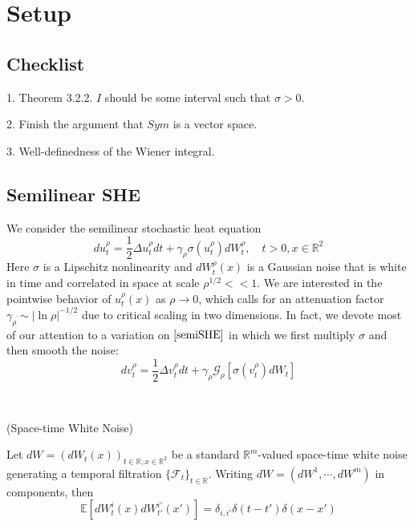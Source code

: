 \newcommand{\htk}{\mathcal{G}}
\newcommand{\tr}{\text{tr}}
\newcommand{\Lip}{\text{Lip}}
\newcommand{\ropV}{\mathcal{V}^{\sigma,\rho}}
\newcommand{\Qbar}{\overline{Q}_{\text{FBSDE}}}
\newcommand{\waser}{\mathcal{W}}
\newcommand{\R}{\mathbb{R}}

\section{Setup}

\subsection{Checklist}

1. Theorem 3.2.2. $I$ should be some interval such that $\sigma > 0$.\par
2. Finish the argument that $Sym$ is a vector space.\par
3. Well-definedness of the Wiener integral.\par

\subsection{Semilinear SHE}

We consider the semilinear stochastic heat equation
\[du^{\rho}_t = \dfrac{1}{2}\Delta u_t^{\rho}dt + \gamma_{\rho}\sigma(u_t^{\rho})dW_t^{\rho},\quad t>0, x\in\mathbb{R}^2\label{semiSHE}\]
Here $\sigma$ is a Lipschitz nonlinearity and $dW_t^{\rho}(x)$ is a Gaussian noise that is white in time and correlated in space at scale $\rho^{1/2} << 1$. We are interested in the pointwise behavior of $u_t^{\rho}(x)$ as $\rho \to 0$, which calls for an attenuation factor $\gamma_{\rho}\sim |\ln \rho|^{-1/2}$ due to critical scaling in two dimensions. In fact, we devote most of our
attention to a variation on $\eqref{semiSHE}$ in which we first multiply $\sigma$ and then smooth the noise:
\[dv_t^{\rho} = \dfrac{1}{2}\Delta v_t^{\rho}dt + \gamma_{\rho}\htk_{\rho}[\sigma(v_t^{\rho})dW_t] \label{spde}\]

\begin{definition}\ \par
    (Space-time White Noise)\par
    Let $dW = (dW_t(x))_{t\in\mathbb{R},x\in\mathbb{R}^2}$ be a standard $\mathbb{R}^m$-valued space-time white noise generating a temporal filtration $\{\mathcal{F}_t\}_{t\in\mathbb{R}}$. Writing $dW = (dW^1,\cdots,dW^m)$ in components, then
    \[\mathbb{E}[dW_t^i(x)dW_{t'}^{i'}(x')] = \delta_{i,i'} \delta(t-t')\delta(x-x')\]
\end{definition}

